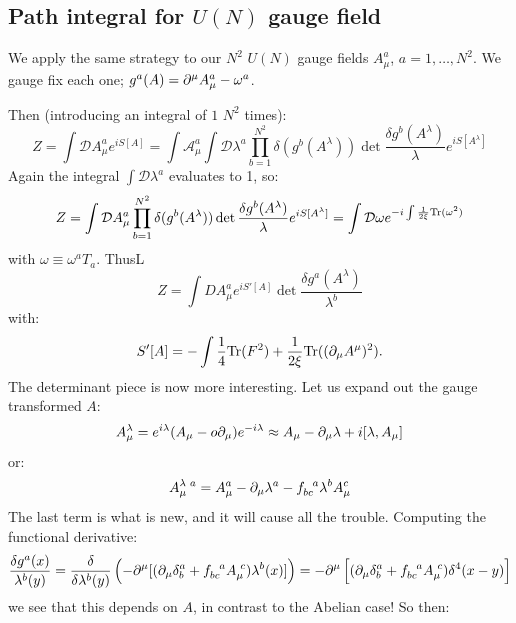 \subsection{Path integral for $U(N)$ gauge field}
We apply the same strategy to our $N^2$ $U(N)$ gauge fields $A_\mu^a$, $a = 1, \ldots, N^2$. We gauge fix each one; $g^a(A) = \partial^\mu A_\mu^a - \omega^a$.

Then (introducing an integral of $1$ $N^2$ times):
\begin{equation}
    Z = \int \mathcal{D}A_\mu^a e^{iS[A]} = \int \mathcal{A}_\mu^a \int \mathcal{D}\lambda^a \prod_{b=1}^{N^2}\delta(g^b(A^\lambda))\det\frac{\delta g^b(A^\lambda)}{\lambda} e^{iS[A^\lambda]}
\end{equation}
Again the integral $\int \mathcal{D}\lambda^a$ evaluates to 1, so:
\begin{equation}
    Z = \int \mathcal{D}A_\mu^a\prod_{b=1}^{N^2}\delta(g^b(A^\lambda))\det\frac{\delta g^b(A^\lambda)}{\lambda} e^{iS[A^\lambda]} = \int \mathcal{D}\omega e^{-i\int \frac{1}{2\xi}\mathrm{Tr}(\omega^2)}
\end{equation}
with $\omega \equiv \omega^a T_a$. ThusL
\begin{equation}
    Z = \int DA_\mu^a e^{iS'[A]}\det\frac{\delta g^a(A^\lambda)}{\lambda^b}
\end{equation}
with:
\begin{equation}
    S'[A] = -\int \frac{1}{4}\mathrm{Tr}(F^2) + \frac{1}{2\xi}\mathrm{Tr}((\partial_\mu A^\mu)^2).
\end{equation}
The determinant piece is now more interesting. Let us expand out the gauge transformed $A$:
\begin{equation}
    A_\mu^\lambda = e^{i\lambda}(A_\mu - o\partial_\mu)e^{-i\lambda} \approx A_\mu - \partial_\mu \lambda + i[\lambda, A_\mu]
\end{equation}
or:
\begin{equation}
    A_\mu^{\lambda\sp a} = A_\mu^a - \p_\mu \lambda^a - f_{bc}^{\sp\sp a} \lambda^b A_\mu^c
\end{equation}
The last term is what is new, and it will cause all the trouble. Computing the functional derivative:
\begin{equation}
    \frac{\delta g^a(x)}{\lambda^b(y)} = \frac{\delta}{\delta \lambda^b(y)}\left(-\p^\mu[(\p_\mu\delta_b^a + f_{bc}^{\sp\sp a}A_\mu^{\sp c})\lambda^b(x)]\right) = -\p^\mu\left[(\p_\mu \delta^a_b + f_{bc}^{\sp\sp a}A_\mu^{\sp c})\delta^4(x-y)\right]
\end{equation}
we see that this depends on $A$, in contrast to the Abelian case! So then:
